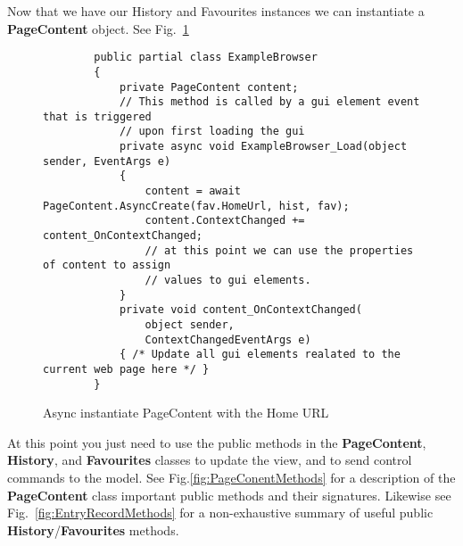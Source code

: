 \documentclass[../Main.tex]{subfiles}
\begin{document}
Now that we have our History and Favourites instances we can instantiate a \textbf{PageContent} object. See Fig.~\ref{fig:asyncCreatePageContent}

\begin{figure}[H]
    \begin{verbatim}
        public partial class ExampleBrowser
        {
            private PageContent content;
            // This method is called by a gui element event that is triggered 
            // upon first loading the gui
            private async void ExampleBrowser_Load(object sender, EventArgs e)
            {
                content = await PageContent.AsyncCreate(fav.HomeUrl, hist, fav);
                content.ContextChanged += content_OnContextChanged;
                // at this point we can use the properties of content to assign 
                // values to gui elements.
            }
            private void content_OnContextChanged(
                object sender,
                ContextChangedEventArgs e)
            { /* Update all gui elements realated to the current web page here */ }
        }
    \end{verbatim}
    \caption{Async instantiate PageContent with the Home URL}
    \label{fig:asyncCreatePageContent}
\end{figure}

At this point you just need to use the public methods in the \textbf{PageContent}, \textbf{History}, and \textbf{Favourites} classes to update the view, and to send control commands to the model. See Fig.\ref{fig:PageConentMethods} for a description of the \textbf{PageContent} class important public methods and their signatures. Likewise see Fig.~\ref{fig:EntryRecordMethods} for a non-exhaustive summary of useful public \textbf{History}/\textbf{Favourites} methods.
\end{document}
